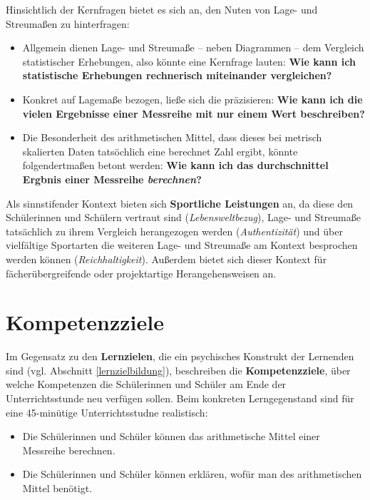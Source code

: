 \documentclass[
]{scrbook}
\providecommand{\tightlist}{%
  \setlength{\itemsep}{0pt}\setlength{\parskip}{0pt}}
\theoremstyle{definition}
\theoremstyle{definition}
\theoremstyle{definition}
\theoremstyle{definition}
\theoremstyle{remark}
\begin{document}
Hinsichtlich der \textcolor{concreteColor}{Kernfragen} bietet es sich an, den Nuten von Lage- und Streumaßen zu hinterfragen:

\begin{itemize}
\tightlist
\item
  Allgemein dienen Lage- und Streumaße -- neben Diagrammen -- dem Vergleich statistischer Erhebungen, also könnte eine Kernfrage lauten: \textbf{Wie kann ich statistische Erhebungen rechnerisch miteinander vergleichen?}
\item
  Konkret auf Lagemaße bezogen, ließe sich die präzisieren: \textbf{Wie kann ich die vielen Ergebnisse einer Messreihe mit nur einem Wert beschreiben?}
\item
  Die Besonderheit des arithmetischen Mittel, dass dieses bei metrisch skalierten Daten tatsöchlich eine berechnet Zahl ergibt, könnte folgendertmaßen betont werden: \textbf{Wie kann ich das durchschnittel Ergbnis einer Messreihe \emph{berechnen}?}
\end{itemize}

Als sinnstifender Kontext bieten sich \textbf{Sportliche Leistungen} an, da diese den Schülerinnen und Schülern vertraut sind (\emph{Lebensweltbezug}), Lage- und Streumaße tatsächlich zu ihrem Vergleich herangezogen werden (\emph{Authentizität}) und über vielfältige Sportarten die weiteren Lage- und Streumaße am Kontext besprochen werden können (\emph{Reichhaltigkeit}). Außerdem bietet sich dieser Kontext für fächerübergreifende oder projektartige Herangehensweisen an.

\section{Kompetenzziele}\label{kompetenzziele}

Im Gegensatz zu den \textbf{Lernzielen}, die ein psychisches Konstrukt der Lernenden sind (vgl. Abschnitt \ref{lernzielbildung}), beschreiben die \textbf{Kompetenzziele}, über welche Kompetenzen die Schülerinnen und Schüler am Ende der Unterrichtsstunde neu verfügen sollen. Beim konkreten Lerngegenstand sind für eine 45-minütige Unterrichtsstudne realistisch:

\begin{itemize}
\tightlist
\item
  Die Schülerinnen und Schüler können das arithmetische Mittel einer Messreihe berechnen.\\
\item
  Die Schülerinnen und Schüler können erklären, wofür man des arithmetischen Mittel benötigt.
\end{itemize}
\end{document}
